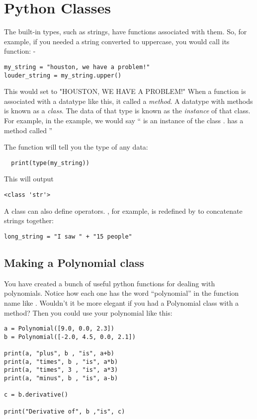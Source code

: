\chapter{Python Classes}

The built-in types, such as strings, have functions associated with
them. So, for example, if you needed a string converted to uppercase,
you would call its  function:
-
\begin{Verbatim}
my_string = "houston, we have a problem!"
louder_string = my_string.upper()
\end{Verbatim}
This would set  to "HOUSTON, WE HAVE A PROBLEM!"
When a function is associated with a datatype like this, it called a
\emph{method}. A datatype with methods is known as a \emph{class}. The
data of that type is known as the \emph{instance} of that class. For
example, in the example, we would say `` is an instance of
the class .  has a method called ''

The function  will tell you the type of any data:
\begin{Verbatim}
  print(type(my_string))
\end{Verbatim}
This will output
\begin{Verbatim}
<class 'str'>
\end{Verbatim}

A class can also define operators.  \pyfunction{+}, for example, is
redefined by  to concatenate strings together:
\begin{Verbatim}
long_string = "I saw " + "15 people"
\end{Verbatim}

\section{Making a Polynomial class}

You have created a bunch of useful python functions for dealing with
polynomials. Notice how each one has the word ``polynomial'' in the
function name like .  Wouldn't it
be more elegant if you had a Polynomial class with a
 method? Then you could use your polynomial
like this:
\begin{Verbatim}
a = Polynomial([9.0, 0.0, 2.3])
b = Polynomial([-2.0, 4.5, 0.0, 2.1])

print(a, "plus", b , "is", a+b)
print(a, "times", b , "is", a*b)
print(a, "times", 3 , "is", a*3)
print(a, "minus", b , "is", a-b)

c = b.derivative()

print("Derivative of", b ,"is", c)
\end{Verbatim}

